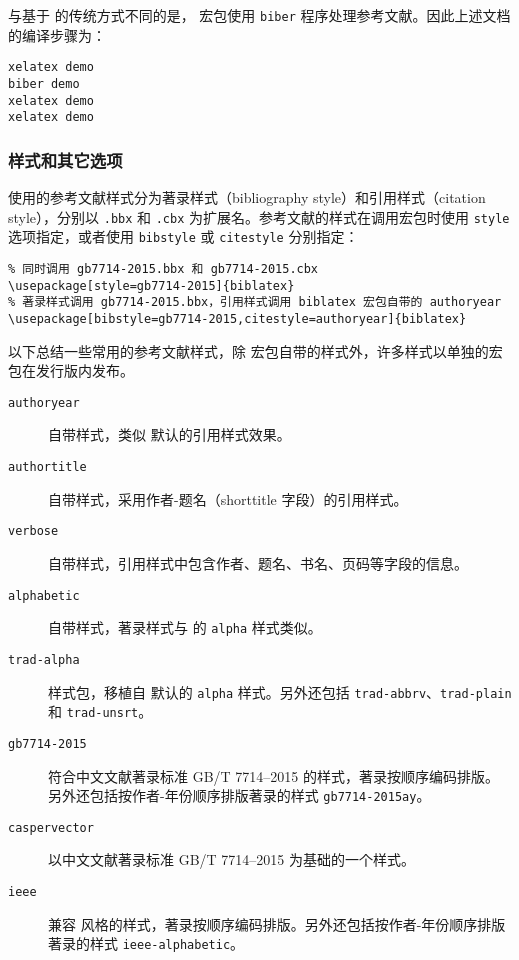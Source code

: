 与基于  的传统方式不同的是， 宏包使用 \texttt{biber} 程序处理参考文献。因此上述文档的编译步骤为：

\begin{verbatim}
xelatex demo
biber demo
xelatex demo
xelatex demo
\end{verbatim}

\subsubsection{ 样式和其它选项}

 使用的参考文献样式分为著录样式（bibliography style）和引用样式（citation style），分别以 \texttt{.bbx} 和 \texttt{.cbx} 为扩展名。参考文献的样式在调用宏包时使用 \texttt{style} 选项指定，或者使用 \texttt{bibstyle} 或 \texttt{citestyle} 分别指定：
\begin{verbatim}
% 同时调用 gb7714-2015.bbx 和 gb7714-2015.cbx
\usepackage[style=gb7714-2015]{biblatex}
% 著录样式调用 gb7714-2015.bbx，引用样式调用 biblatex 宏包自带的 authoryear
\usepackage[bibstyle=gb7714-2015,citestyle=authoryear]{biblatex}
\end{verbatim}

以下总结一些常用的参考文献样式，除  宏包自带的样式外，许多样式以单独的宏包在发行版内发布。

\begin{description}
  \item[\texttt{authoryear}]
   自带样式，类似  默认的引用样式效果。
  \item[\texttt{authortitle}]
   自带样式，采用作者-题名（shorttitle 字段）的引用样式。
  \item[\texttt{verbose}]
   自带样式，引用样式中包含作者、题名、书名、页码等字段的信息。
  \item[\texttt{alphabetic}]
   自带样式，著录样式与  的 \texttt{alpha} 样式类似。
  \item[\texttt{trad-alpha}]
   样式包，移植自  默认的 \texttt{alpha} 样式。另外还包括 \texttt{trad-abbrv}、\texttt{trad-plain} 和 \texttt{trad-unsrt}。
  \item[\texttt{gb7714-2015}]
  符合中文文献著录标准 GB/T 7714--2015 的样式，著录按顺序编码排版。另外还包括按作者-年份顺序排版著录的样式 \texttt{gb7714-2015ay}。
  \item[\texttt{caspervector}]
  以中文文献著录标准 GB/T 7714--2015 为基础的一个样式。
  \item[\texttt{ieee}]
  兼容  风格的样式，著录按顺序编码排版。另外还包括按作者-年份顺序排版著录的样式 \texttt{ieee-alphabetic}。
\end{description}

